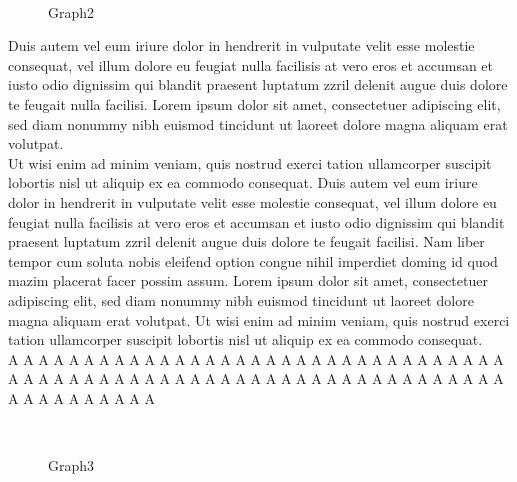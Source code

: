 \documentclass{scrartcl}
\begin{document}
\noindent \begin{wrapfigure}{r!}{0.37\textwidth}
     \vspace{-12pt}
     { \centering %
     \\ }
     \vspace{-5pt}
     \caption{Graph2}
     \vspace{-20pt}
\end{wrapfigure}
Duis autem vel eum iriure dolor in hendrerit in vulputate velit esse molestie consequat, vel illum dolore eu feugiat nulla facilisis at vero eros et accumsan et iusto odio dignissim qui blandit praesent luptatum zzril delenit augue duis dolore te feugait nulla facilisi. Lorem ipsum dolor sit amet, consectetuer adipiscing elit, sed diam nonummy nibh euismod tincidunt ut laoreet dolore magna aliquam erat volutpat.   \\[8pt]
Ut wisi enim ad minim veniam, quis nostrud exerci tation ullamcorper suscipit lobortis nisl ut aliquip ex ea commodo consequat. Duis autem vel eum iriure dolor in hendrerit in vulputate velit esse molestie consequat, vel illum dolore eu feugiat nulla facilisis at vero eros et accumsan et iusto odio dignissim qui blandit praesent luptatum zzril delenit augue duis dolore te feugait facilisi.   \newpage
\noindent %
Nam liber tempor cum soluta nobis eleifend option congue nihil imperdiet doming id quod mazim placerat facer possim assum. Lorem ipsum dolor sit amet, consectetuer adipiscing elit, sed diam nonummy nibh euismod tincidunt ut laoreet dolore magna aliquam erat volutpat. Ut wisi enim ad minim veniam, quis nostrud exerci tation ullamcorper suscipit lobortis nisl ut aliquip ex ea commodo consequat.  \\[8pt]
A A A A A A A A A A A A A A A A A A A A A A A A A A A A A A A A A A A A A A A A A A  A A A A A A A A A A A A A A A A A A A A A A A A A A A A A A A A A A
\begin{figure}[h]
    \centering
     \\
    \caption{Graph3}
\end{figure}
\end{document}
